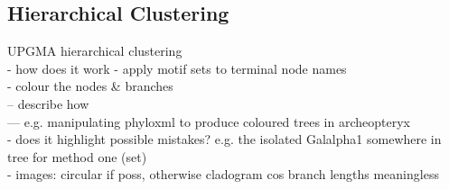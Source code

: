 \documentclass[12pt,a4paper]{article}
\begin{document}
\subsection{Hierarchical Clustering}
\label{sec:clustering}

UPGMA hierarchical clustering\\
- how does it work
- apply motif sets to terminal node names\\
- colour the nodes \& branches\\
-- describe how\\
--- e.g. manipulating phyloxml to produce coloured trees in archeopteryx\\
- does it highlight possible mistakes? e.g. the isolated Galalpha1 somewhere in tree for method one (set)\\
- images: circular if poss, otherwise cladogram cos branch lengths meaningless\\








\end{document}
